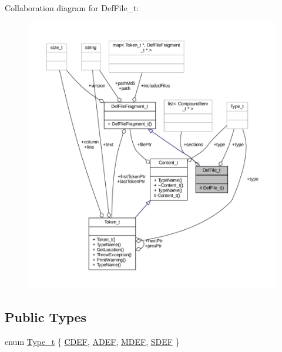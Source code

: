 Collaboration diagram for Def\+File\+\_\+t\+:
\nopagebreak
\begin{figure}[H]
\begin{center}
\leavevmode
\includegraphics[width=350pt]{struct_def_file__t__coll__graph}
\end{center}
\end{figure}
\subsection*{Public Types}
\begin{DoxyCompactItemize}
\item 
enum \hyperlink{struct_def_file__t_a59fae89a0e59f29d463910ebff12ebde}{Type\+\_\+t} \{ \hyperlink{struct_def_file__t_a59fae89a0e59f29d463910ebff12ebdeafde842e406aa278f1b7854fcec114590}{C\+D\+EF}, 
\hyperlink{struct_def_file__t_a59fae89a0e59f29d463910ebff12ebdea40d7a109ede32d0442064e07b63e1bc1}{A\+D\+EF}, 
\hyperlink{struct_def_file__t_a59fae89a0e59f29d463910ebff12ebdea78fefcdce1dfa032dc9c8a1d6a17aa7a}{M\+D\+EF}, 
\hyperlink{struct_def_file__t_a59fae89a0e59f29d463910ebff12ebdea57b8900b415bd5eb0f97ab7bf30e1961}{S\+D\+EF}
 \}
\end{DoxyCompactItemize}
